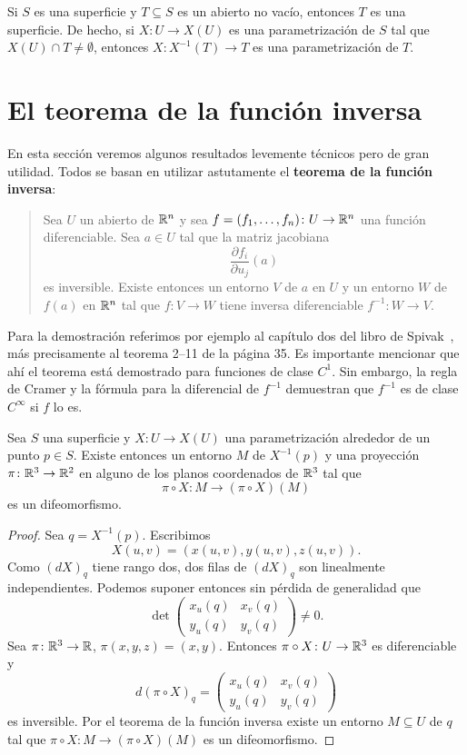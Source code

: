 \begin{example}
	Si $S$ es una superficie y $T\subseteq S$ es un abierto no vacío, entonces
	$T$ es una superficie. De hecho, si $X\colon U\to X(U)$ es una
	parametrización de $S$ tal que $X(U)\cap T\ne\emptyset$, entonces $X\colon
	X^{-1}(T)\to T$ es una parametrización de $T$.
\end{example}

\chapter{El teorema de la función inversa}

En esta sección veremos algunos resultados levemente técnicos pero de gran
utilidad. Todos se basan en utilizar astutamente el \textbf{teorema de la
función inversa}:
\begin{quote}
	Sea $U$ un abierto de $\mathbb{R}^n$ y sea $f=(f_1,\dots,f_n)\colon U\to\mathbb{R}^n$ una
	función diferenciable. Sea $a\in U$ tal que la matriz jacobiana
	\[
		\frac{\partial f_i}{\partial u_j}(a)
	\]
	es inversible. Existe entonces un entorno $V$ de $a$ en $U$ y un entorno $W$
	de $f(a)$ en $\mathbb{R}^n$ tal que $f\colon V\to W$ tiene inversa diferenciable
	$f^{-1}\colon W\to V$. 
\end{quote}

Para la demostración referimos por ejemplo al capítulo dos del libro de
Spivak~\cite{MR0209411}, más precisamente al teorema 2--11 de la página 35. Es
importante mencionar que ahí el teorema está demostrado para funciones de clase
$C^1$. Sin embargo, la regla de Cramer y la fórmula para la diferencial de
$f^{-1}$ demuestran que $f^{-1}$ es de clase $C^\infty$ si $f$ lo es.

\begin{lemma}
	\label{lem:inverse}
	Sea $S$ una superficie y $X\colon U\to X(U)$ una parametrización alrededor
	de un punto $p\in S$. Existe entonces un entorno $M$ de $X^{-1}(p)$ y una
	proyección $\pi\colon \mathbb{R}^3\to\mathbb{R}^2$ en alguno de los planos coordenados de
	$\mathbb{R}^3$ tal que \[
	\pi\circ X\colon M\to (\pi\circ X)(M)
	\]
	es un difeomorfismo.
\end{lemma}

\begin{proof}
	Sea $q=X^{-1}(p)$. 
	Escribimos
	\[
		X(u,v)=(x(u,v),y(u,v),z(u,v)).
	\]
	Como $(dX)_q$ tiene rango dos, dos filas de $(dX)_q$ son linealmente
	independientes. Podemos suponer entonces sin pérdida de generalidad que 
	\[
	\det\begin{pmatrix}
			x_u(q) & x_v(q)\\
			y_u(q) & y_v(q)
		\end{pmatrix}\ne0.
	\]
	Sea $\pi\colon\mathbb{R}^3\to\mathbb{R}$, $\pi(x,y,z)=(x,y)$. Entonces $\pi\circ X\colon U\to\mathbb{R}^3$ es diferenciable
	y 
	\[
		d(\pi\circ X)_q=\begin{pmatrix}
			x_u(q) & x_v(q)\\
			y_u(q) & y_v(q)
		\end{pmatrix}
	\]
	es inversible. Por el teorema de la función inversa existe un entorno
	$M\subseteq U$ de $q$ tal que $\pi\circ X\colon M\to (\pi\circ X)(M)$ es un
	difeomorfismo.
\end{proof}

